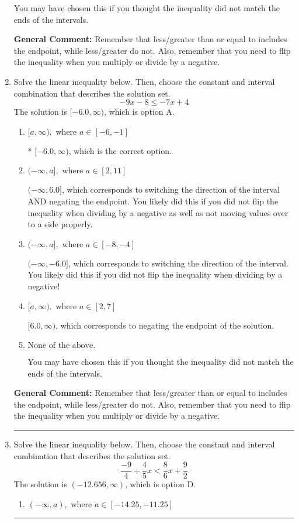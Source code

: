 \documentclass{extbook}[14pt]
\newcommand{\litem}[1]{\item #1

\rule{\textwidth}{0.4pt}}
\begin{document}
\begin{enumerate}
{\begin{enumerate}[label=\Alph*.]
You may have chosen this if you thought the inequality did not match the ends of the intervals.
\end{enumerate}

\textbf{General Comment:} Remember that less/greater than or equal to includes the endpoint, while less/greater do not. Also, remember that you need to flip the inequality when you multiply or divide by a negative.
}
\litem{
Solve the linear inequality below. Then, choose the constant and interval combination that describes the solution set.
\[ -9x -8 \leq -7x + 4 \]The solution is \( [-6.0, \infty) \), which is option A.\begin{enumerate}[label=\Alph*.]
\item \( [a, \infty), \text{ where } a \in [-6, -1] \)

* $[-6.0, \infty)$, which is the correct option.
\item \( (-\infty, a], \text{ where } a \in [2, 11] \)

 $(-\infty, 6.0]$, which corresponds to switching the direction of the interval AND negating the endpoint. You likely did this if you did not flip the inequality when dividing by a negative as well as not moving values over to a side properly.
\item \( (-\infty, a], \text{ where } a \in [-8, -4] \)

 $(-\infty, -6.0]$, which corresponds to switching the direction of the interval. You likely did this if you did not flip the inequality when dividing by a negative!
\item \( [a, \infty), \text{ where } a \in [2, 7] \)

 $[6.0, \infty)$, which corresponds to negating the endpoint of the solution.
\item \( \text{None of the above}. \)

You may have chosen this if you thought the inequality did not match the ends of the intervals.
\end{enumerate}

\textbf{General Comment:} Remember that less/greater than or equal to includes the endpoint, while less/greater do not. Also, remember that you need to flip the inequality when you multiply or divide by a negative.
}
\litem{
Solve the linear inequality below. Then, choose the constant and interval combination that describes the solution set.
\[ \frac{-9}{4} + \frac{4}{5} x < \frac{8}{6} x + \frac{9}{2} \]The solution is \( (-12.656, \infty) \), which is option D.\begin{enumerate}[label=\Alph*.]
\item \( (-\infty, a), \text{ where } a \in [-14.25, -11.25] \)


\end{enumerate}}
\end{enumerate}
\end{document}
